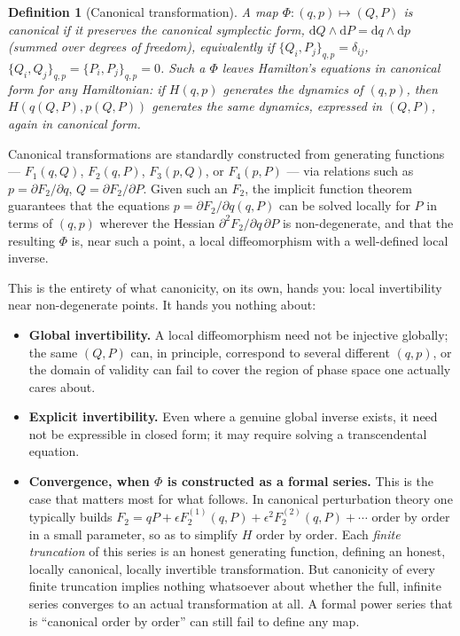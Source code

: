 \documentclass[11pt]{article}
\newtheorem{definition}{Definition}
\newcommand{\dd}{\mathrm{d}}
\begin{document}
\begin{definition}[Canonical transformation]
A map $\Phi:(q,p)\mapsto(Q,P)$ is \emph{canonical} if it preserves the canonical symplectic form, $\dd Q\wedge\dd P=\dd q\wedge \dd p$ (summed over degrees of freedom), equivalently if $\{Q_i,P_j\}_{q,p}=\delta_{ij}$, $\{Q_i,Q_j\}_{q,p}=\{P_i,P_j\}_{q,p}=0$. Such a $\Phi$ leaves Hamilton's equations in canonical form for any Hamiltonian: if $H(q,p)$ generates the dynamics of $(q,p)$, then $H(q(Q,P),p(Q,P))$ generates the same dynamics, expressed in $(Q,P)$, again in canonical form.
\end{definition}

Canonical transformations are standardly constructed from generating functions --- $F_1(q,Q)$, $F_2(q,P)$, $F_3(p,Q)$, or $F_4(p,P)$ --- via relations such as $p=\partial F_2/\partial q$, $Q=\partial F_2/\partial P$. Given such an $F_2$, the implicit function theorem guarantees that the equations $p=\partial F_2/\partial q(q,P)$ can be solved locally for $P$ in terms of $(q,p)$ wherever the Hessian $\partial^2F_2/\partial q\,\partial P$ is non-degenerate, and that the resulting $\Phi$ is, near such a point, a local diffeomorphism with a well-defined local inverse.

This is the entirety of what canonicity, on its own, hands you: local invertibility near non-degenerate points. It hands you nothing about:
\begin{itemize}
\item \textbf{Global invertibility.} A local diffeomorphism need not be injective globally; the same $(Q,P)$ can, in principle, correspond to several different $(q,p)$, or the domain of validity can fail to cover the region of phase space one actually cares about.
\item \textbf{Explicit invertibility.} Even where a genuine global inverse exists, it need not be expressible in closed form; it may require solving a transcendental equation.
\item \textbf{Convergence, when $\Phi$ is constructed as a formal series.} This is the case that matters most for what follows. In canonical perturbation theory one typically builds $F_2=qP+\epsilon F_2^{(1)}(q,P)+\epsilon^2F_2^{(2)}(q,P)+\cdots$ order by order in a small parameter, so as to simplify $H$ order by order. Each \emph{finite truncation} of this series is an honest generating function, defining an honest, locally canonical, locally invertible transformation. But canonicity of every finite truncation implies nothing whatsoever about whether the full, infinite series converges to an actual transformation at all. A formal power series that is ``canonical order by order'' can still fail to define any map.
\end{itemize}
\end{document}
